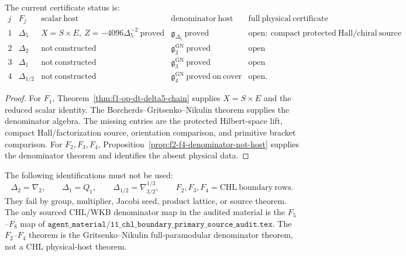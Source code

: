 \begin{corollary}
The current certificate status is:
\[
\begin{array}{c|c|c|c|c}
j&F_j&\mathrm{scalar\ host}&\mathrm{denominator\ host}&
\mathrm{full\ physical\ certificate}\\ \hline
1&\Delta_5&
X=S\times E,\ Z=-4096\Delta_5^{-2}\ \mathrm{proved}&
\mathfrak g_{\Delta_5}\ \mathrm{proved}&
\mathrm{open:\ compact\ protected\ Hall/chiral\ source}\\
2&\Delta_2&\mathrm{not\ constructed}&
\mathfrak g^{\mathrm{GN}}_2\ \mathrm{proved}&
\mathrm{open}\\
3&\Delta_1&\mathrm{not\ constructed}&
\mathfrak g^{\mathrm{GN}}_3\ \mathrm{proved}&
\mathrm{open}\\
4&\Delta_{1/2}&\mathrm{not\ constructed}&
\mathfrak g^{\mathrm{GN}}_4\ \mathrm{proved\ on\ cover}&
\mathrm{open}.
\end{array}
\]
\end{corollary}

\begin{proof}
For \(F_1\), Theorem~\ref{thm:f1-op-dt-delta5-chain} supplies
\(X=S\times E\) and the reduced scalar identity.  The
Borcherds--Gritsenko--Nikulin theorem supplies the denominator algebra.
The missing entries are the protected Hilbert-space lift, compact
Hall/factorization source, orientation comparison, and primitive bracket
comparison.  For \(F_2,F_3,F_4\), Proposition~\ref{prop:f2-f4-denominator-not-host}
supplies the denominator theorem and identifies the absent physical
data.
\end{proof}

\begin{remark}
The following identifications must not be used:
\[
\Delta_2=\nabla_2,\qquad
\Delta_1=Q_1,\qquad
\Delta_{1/2}=\nabla_{3/2}^{1/3},\qquad
F_2,F_3,F_4=\mathrm{CHL\ boundary\ rows}.
\]
They fail by group, multiplier, Jacobi seed, product lattice, or
source theorem.  The only sourced CHL/WKB denominator map in the audited
material is the \(F_5\)--\(F_8\) map of
\(\texttt{agent\_material/11\_chl\_boundary\_primary\_source\_audit.tex}\).
The \(F_2\)--\(F_4\) theorem is the Gritsenko--Nikulin full-paramodular
denominator theorem, not a CHL physical-host theorem.
\end{remark}

